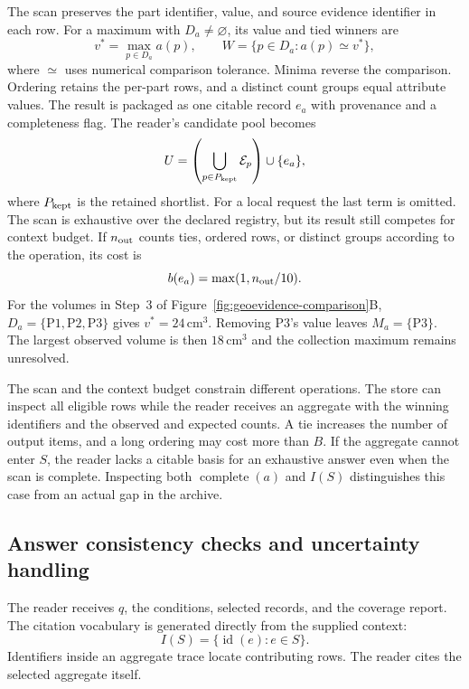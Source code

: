 The scan preserves the part identifier, value, and source evidence identifier in each row. For a maximum with $D_a\ne\varnothing$, its value and tied winners are
\begin{equation}
 v^*=\max_{p\in D_a}a(p),\qquad
 W=\{p\in D_a:a(p)\simeq v^*\},
\end{equation}
where $\simeq$ uses numerical comparison tolerance. Minima reverse the comparison. Ordering retains the per-part rows, and a distinct count groups equal attribute values. The result is packaged as one citable record $e_a$ with provenance and a completeness flag. The reader's candidate pool becomes
\begin{equation}
 U=\left(\bigcup_{p\in P_{\rm kept}}\mathcal E_p\right)\cup\{e_a\},
\end{equation}
where $P_{\rm kept}$ is the retained shortlist. For a local request the last term is omitted. The scan is exhaustive over the declared registry, but its result still competes for context budget. If $n_{\rm out}$ counts ties, ordered rows, or distinct groups according to the operation, its cost is
\begin{equation}
 b(e_a)=\max(1,n_{\rm out}/10).
\end{equation}
For the volumes in Step~3 of Figure~\ref{fig:geoevidence-comparison}B, $D_a=\{\mathrm{P1},\mathrm{P2},\mathrm{P3}\}$ gives $v^*=24\,\mathrm{cm}^3$. Removing P3's value leaves $M_a=\{\mathrm{P3}\}$. The largest observed volume is then $18\,\mathrm{cm}^3$ and the collection maximum remains unresolved.

The scan and the context budget constrain different operations. The store can inspect all eligible rows while the reader receives an aggregate with the winning identifiers and the observed and expected counts. A tie increases the number of output items, and a long ordering may cost more than $B$. If the aggregate cannot enter $S$, the reader lacks a citable basis for an exhaustive answer even when the scan is complete. Inspecting both $\operatorname{complete}(a)$ and $I(S)$ distinguishes this case from an actual gap in the archive.

\subsection{Answer consistency checks and uncertainty handling}
\label{sec:method-verification}
The reader receives $q$, the conditions, selected records, and the coverage report. The citation vocabulary is generated directly from the supplied context:
\begin{equation}
 I(S)=\{\operatorname{id}(e):e\in S\}.
\end{equation}
Identifiers inside an aggregate trace locate contributing rows. The reader cites the selected aggregate itself.

